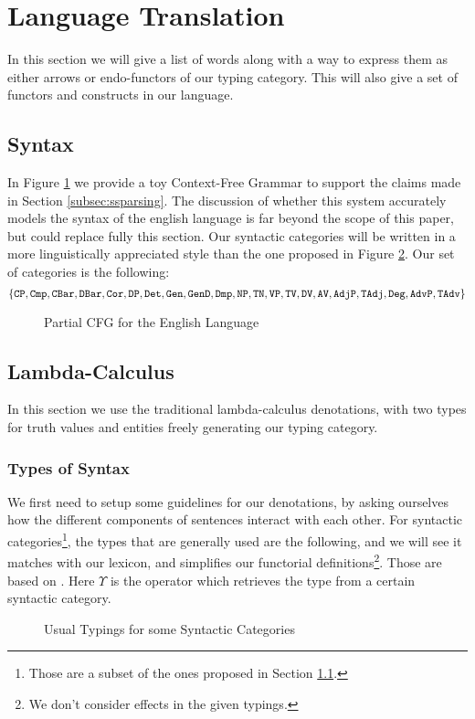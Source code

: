 \section{Language Translation}
\label{sec:language}
In this section we will give a list of words along with a way to express them as either arrows or endo-functors of our typing category.
This will also give a set of functors and constructs in our language.

\subsection{Syntax}
\label{subsec:syntax}
In Figure \ref{fig:english-cfg} we provide a toy Context-Free Grammar to
support the claims made in Section \ref{subsec:ssparsing}.
The discussion of whether this system accurately models the syntax of the
english language is far beyond the scope of this paper, but could replace
fully this section.
Our syntactic categories will be written in a more linguistically
appreciated style than the one proposed in Figure \ref{fig:sctypes}.
Our set of categories is the following:
\begin{equation*}
	\left\{\tt CP, Cmp, CBar, DBar, Cor, DP, Det, Gen, GenD, Dmp, NP, TN, VP, TV, DV, AV, AdjP, TAdj, Deg, AdvP, TAdv \right\}
\end{equation*}

\begin{figure}
	\caption{Partial CFG for the English Language}\label{fig:english-cfg}
\end{figure}

\subsection{Lambda-Calculus}\label{subsec:lambdacalc}
In this section we use the traditional lambda-calculus denotations, with
two types for truth values and entities freely generating our typing category.

\subsubsection{Types of Syntax}\label{subsec:typingsyntax}
We first need to setup some guidelines for our denotations, by asking ourselves
how the different components of sentences interact with each other.
For syntactic categories\footnote{Those are a subset of the ones proposed
	in Section \ref{subsec:syntax}.}, the types that are generally used are the
following, and we will see it matches with our lexicon, and simplifies our
functorial definitions\footnote{We don't consider effects in the given typings.}.
Those are based on . Here $\Upsilon$ is the
operator which retrieves the type from a certain syntactic category.
\begin{figure}
	\centering
	\caption{Usual Typings for some Syntactic Categories}
	\label{fig:sctypes}
\end{figure}


